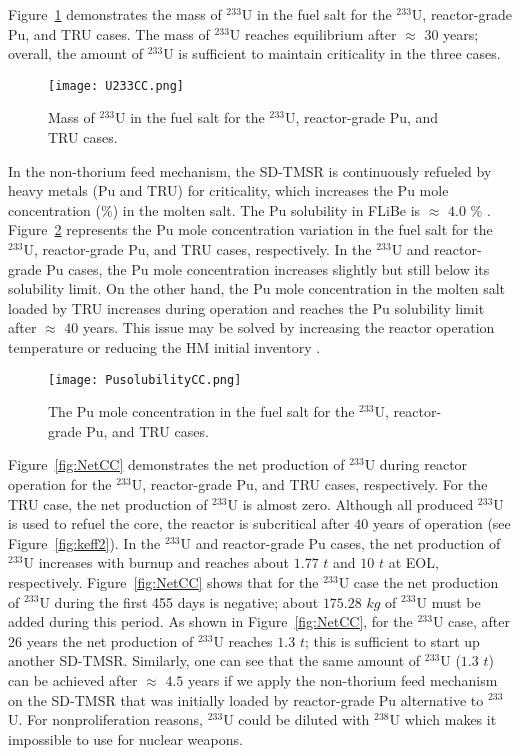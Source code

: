 Figure~\ref{fig:U233CC} demonstrates the mass of $^{233}$U in the fuel salt 
for the $^{233}$U, reactor-grade Pu, and TRU cases. The mass of 
$^{233}$U reaches equilibrium after $\approx$ $30$ years; overall, the 
amount of $^{233}$U is sufficient to maintain criticality in 
the three cases.
\begin{figure}
	\centering
	\texttt{[image: U233CC.png]}
	\caption{Mass of $^{233}$U in the fuel salt for the $^{233}$U, reactor-grade Pu, and TRU cases.}
	\label{fig:U233CC}
\end{figure}

In the non-thorium feed mechanism, the SD-TMSR is continuously refueled by heavy metals (Pu and TRU) for 
criticality, which increases the Pu mole concentration (\%) in the molten salt. 
The Pu solubility in FLiBe is 
$\approx$ $4.0$ \% \cite{ignatiev2012progress,sood1975plutonium}. 
Figure~\ref{fig:PusolubilityCC} represents the Pu mole concentration variation in the fuel salt 
for the $^{233}$U, reactor-grade Pu, and TRU cases, respectively. In the $^{233}$U and reactor-grade Pu cases, the Pu mole concentration increases 
slightly but still below its solubility limit. On the other hand, the Pu 
mole concentration in the molten salt loaded by TRU increases during operation and 
reaches the Pu solubility limit after $\approx$ $40$ years. This issue may 
be solved by increasing the reactor operation temperature or reducing the 
HM initial inventory \cite{zou2018transition}.
\begin{figure}
	\centering
	\texttt{[image: PusolubilityCC.png]}
	\caption{The Pu mole concentration in the fuel salt for the $^{233}$U, reactor-grade Pu, and TRU cases.}
	\label{fig:PusolubilityCC}
\end{figure}
\FloatBarrier

Figure~\ref{fig:NetCC} demonstrates the net production of $^{233}$U during 
reactor operation for the $^{233}$U, reactor-grade Pu, and TRU cases, respectively. For the TRU case, the net production of $^{233}$U is almost 
zero. 
Although all produced $^{233}$U is used to refuel the core, the reactor is subcritical after $40$ years of operation (see Figure~\ref{fig:keff2}).
In the $^{233}$U and reactor-grade Pu cases, the net production of 
$^{233}$U increases with burnup and reaches about $1.77$ $t$ and $10$ $t$ at EOL, respectively. Figure~\ref{fig:NetCC} shows that for the $^{233}$U 
case the net production of $^{233}$U during the first 455 days is negative; 
about $175.28$ $kg$ of $^{233}$U must be added during this period. 
As shown in Figure~\ref{fig:NetCC}, for the $^{233}$U case, after 26 years the net production of $^{233}$U reaches 
$1.3$ $t$; this is sufficient to start up another \gls{SD-TMSR}. Similarly, 
one can see that the same amount of $^{233}$U ($1.3$ $t$) can be achieved 
after $\approx$ $4.5$ years if we apply the non-thorium feed mechanism on 
the SD-TMSR that was initially loaded by reactor-grade Pu alternative to 
$^{233}$U. For nonproliferation reasons, $^{233}$U could be diluted with $^{238}$U which makes it impossible to use for nuclear weapons.
  

